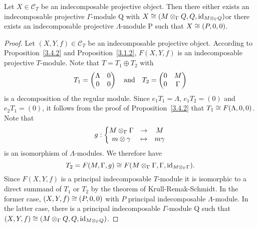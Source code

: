 %




\begin{corollary}\label{3.4.3}
Let $X \in \mathcal{C}_T$ be an indecomposable projective object. Then there either exists
an indecomposable projective $\Gamma$-module Q with $X \cong (M \otimes_\Gamma Q, Q, \operatorname{id}_{M \otimes_\Gamma
Q})$or there exists an indecomposable projective $\Lambda$-module P such that $X
\cong (P, 0, 0)$.
\end{corollary}


\begin{proof}
Let $(X,Y,f) \in \mathcal{C}_T$ be an indecomposable projective object. According to
Proposition~\ref{3.4.2} and Proposition~\ref{3.1.2}, $F(X,Y,f)$ is an indecomposable projective $T$-module.
Note that $T = T_1 \oplus T_2$ with
\[
T_1 =
\begin{pmatrix}
\Lambda & 0 \\ 0 & 0
\end{pmatrix} \quad\text{and}\quad
T_2 =
\begin{pmatrix}
0 & M \\ 0 & \Gamma
\end{pmatrix}
\]
is a decomposition of the regular module. Since $e_1 T_1 = \Lambda$, $e_1 T_2 = (0)$ and $e_2 T_1 = (0)$, it follows from the proof of Proposition~\ref{3.4.2} that $T_1 \cong F(\Lambda, 0, 0)$. Note that
\[
g: \left\{ \begin{matrix} M \otimes_\Gamma \Gamma & \to & M \\ m \otimes \gamma & \mapsto & m\gamma \end{matrix} \right.
\]
is an isomorphism of $\Lambda$-modules. We therefore have
\[
T_2 = F(M, \Gamma, g) \cong F(M \otimes_\Gamma \Gamma, \Gamma, \operatorname{id}_{M \otimes_\Gamma \Gamma}).
\]
Since $F(X, Y, f)$ is a principal indecomposable $T$-module it is isomorphic to a direct summand of $T_1$ or $T_2$ by the theorem of Krull-Remak-Schmidt. In the former case, $(X,Y,f) \cong (P,0,0)$ with $P$ principal indecomposable $\Lambda$-module. In the latter case, there is a principal indecomposable $\Gamma$-module Q such that $(X,Y,f) \cong (M \otimes_\Gamma Q, Q, \operatorname{id}_{M \otimes_\Gamma Q})$.
\end{proof}

